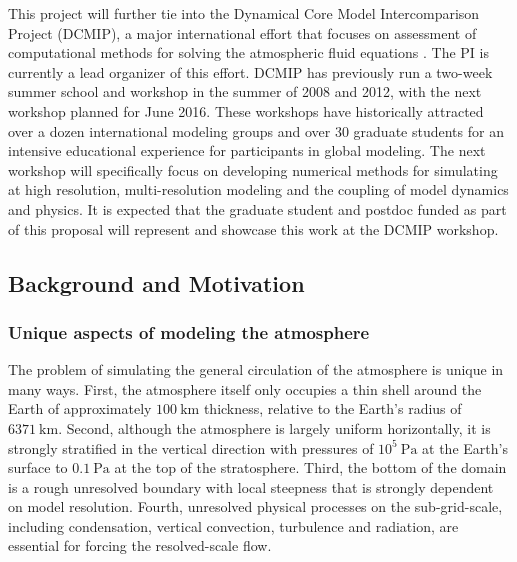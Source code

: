 \documentclass[11pt]{article}
\begin{document}
This project will further tie into the Dynamical Core Model Intercomparison Project (DCMIP), a major international effort that focuses on assessment of computational methods for solving the atmospheric fluid equations \citep{DCMIP2012TESTCASES,JKPAUCJ2012QJRMS}.  The PI is currently a lead organizer of this effort.  DCMIP has previously run a two-week summer school and workshop in the summer of 2008 and 2012, with the next workshop planned for June 2016.  These workshops have historically attracted over a dozen international modeling groups and over 30 graduate students for an intensive educational experience for participants in global modeling.  The next workshop will specifically focus on developing numerical methods for simulating at high resolution, multi-resolution modeling and the coupling of model dynamics and physics.  It is expected that the graduate student and postdoc funded as part of this proposal will represent and showcase this work at the DCMIP workshop.

\subsection{Background and Motivation} \label{sec:BackgroundMotivation}

\subsubsection{Unique aspects of modeling the atmosphere} \label{sec:UniqueAtmosphere}

The problem of simulating the general circulation of the atmosphere is unique in many ways.  First, the atmosphere itself only occupies a thin shell around the Earth of approximately $100\ \mbox{km}$ thickness, relative to the Earth's radius of $6371\ \mbox{km}$.  Second, although the atmosphere is largely uniform horizontally, it is strongly stratified in the vertical direction with pressures of $10^5\ \mbox{Pa}$ at the Earth's surface to $0.1\ \mbox{Pa}$ at the top of the stratosphere.  Third, the bottom of the domain is a rough unresolved boundary with local steepness that is strongly dependent on model resolution.  Fourth, unresolved physical processes on the sub-grid-scale, including condensation, vertical convection, turbulence and radiation, are essential for forcing the resolved-scale flow.
\end{document}
